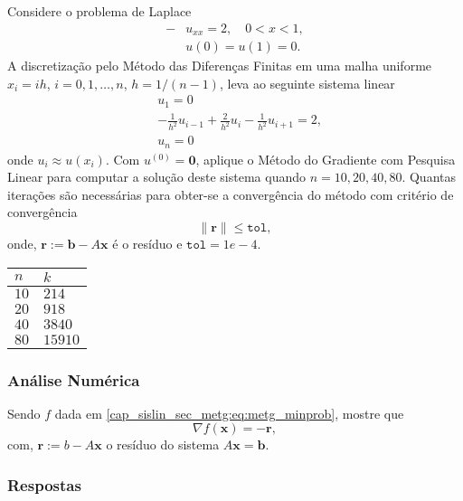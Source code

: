 \begin{exer}
  Considere o problema de Laplace
  \begin{align}
    -&u_{xx} = 2,\quad 0 < x < 1,\\
     &u(0) = u(1) = 0.
  \end{align}
  A discretização pelo Método das Diferenças Finitas em uma malha uniforme $x_i = ih$, $i=0,1,\dotsc,n$, $h=1/(n-1)$, leva ao seguinte sistema linear
  \begin{align}
    &u_1 = 0\\
    &-\frac{1}{h^2}u_{i-1} + \frac{2}{h^2}u_{i} - \frac{1}{h^2}u_{i+1} = 2,\\
    &u_n = 0
  \end{align}
  onde $u_i \approx u(x_i)$. Com $u^{(0)} = \pmb{0}$, aplique o Método do Gradiente com Pesquisa Linear para computar a solução deste sistema quando $n=10, 20, 40, 80$. Quantas iterações são necessárias para obter-se a convergência do método com critério de convergência
  \begin{equation}
    \|\pmb{r}\| \leq \texttt{tol},
  \end{equation}
  onde, $\pmb{r} := \pmb{b} - A\pmb{x}$ é o resíduo e $\texttt{tol} = 1e-4$.
\end{exer}
\begin{resp}
  \begin{tabular}{ll}
    $n$ & $k$\\\hline
    $10$ & $214$\\
    $20$ & $918$\\
    $40$ & $3840$\\
    $80$ & $15910$
  \end{tabular}
\end{resp}

\subsubsection{Análise Numérica}

\begin{exer}
  Sendo $f$ dada em \eqref{cap_sislin_sec_metg:eq:metg_minprob}, mostre que
  \begin{equation}
    \nabla f\left(\pmb{x}\right) = -\pmb{r},
  \end{equation}
  com, $\pmb{r} := b - A\pmb{x}$ o resíduo do sistema $A\pmb{x} = \pmb{b}$.
\end{exer}

\ifisbook
\subsubsection{Respostas}
\shipoutAnswer
\fi

